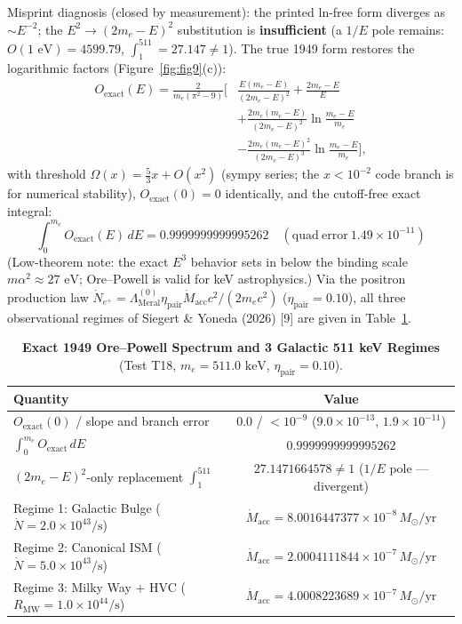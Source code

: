 \documentclass[12pt,a4paper]{article}
\begin{document}
Misprint diagnosis (closed by measurement): the printed ln-free form diverges as $\sim E^{-2}$; the $E^2\to(2m_e-E)^2$ substitution is \textbf{insufficient} (a $1/E$ pole remains: $O(1\text{ eV})=4599.79$, $\int_1^{511}=27.147\ne1$). The true 1949 form restores the logarithmic factors (Figure~\ref{fig:fig9}(c)):
\begin{equation}
\begin{split}
O_{\mathrm{exact}}(E) = \frac{2}{m_e(\pi^2-9)} \Bigg[ &\frac{E(m_e-E)}{(2m_e-E)^2} + \frac{2m_e-E}{E} \\
&+ \frac{2m_e(m_e-E)}{(2m_e-E)^2}\ln\frac{m_e-E}{m_e} \\
&- \frac{2m_e(m_e-E)^2}{(2m_e-E)^3}\ln\frac{m_e-E}{m_e} \Bigg],
\end{split}
\label{eq:oexact}
\end{equation}
with threshold $\Omega(x)=\frac53x+O(x^2)$ (sympy series; the $x<10^{-2}$ code branch is for numerical stability), $O_{\mathrm{exact}}(0)=0$ identically, and the cutoff-free exact integral:
\begin{equation}
\boxed{\int_0^{m_e} O_{\mathrm{exact}}(E)\,dE = 0.9999999999995262 \quad (\mathrm{quad\ error\ } 1.49\times 10^{-11})}
\label{eq:opnorm}
\end{equation}
(Low-theorem note: the exact $E^3$ behavior sets in below the binding scale $m\alpha^2\approx27\text{ eV}$; Ore--Powell is valid for keV astrophysics.) Via the positron production law $\dot{N}_{e^+} = \Lambda_{\mathrm{Meral}}^{(0)}\eta_{\mathrm{pair}}\dot{M}_{\mathrm{acc}}c^2/(2m_ec^2)$ ($\eta_{\mathrm{pair}}=0.10$), all three observational regimes of Siegert \& Yoneda (2026) [9] are given in Table~\ref{tab:t18}.

\begin{table}[!htbp]
\centering
\footnotesize
\setlength{\tabcolsep}{3pt}
\caption{\textbf{Exact 1949 Ore--Powell Spectrum and 3 Galactic 511 keV Regimes} (Test T18, $m_e=511.0\text{ keV}$, $\eta_{\mathrm{pair}}=0.10$).}
\label{tab:t18}
\vspace{0.1cm}
\begin{tabular}{@{}l|c@{}}
\hline
Quantity & Value \\
\hline
$O_{\mathrm{exact}}(0)$ / slope and branch error & $0.0$ / $<10^{-9}$ ($9.0\times10^{-13}$, $1.9\times10^{-11}$) \\
$\int_0^{m_e} O_{\mathrm{exact}}\,dE$ & $0.9999999999995262$ \\
$(2m_e-E)^2$-only replacement $\int_1^{511}$ & $27.1471664578\ne1$ ($1/E$ pole --- divergent) \\
Regime 1: Galactic Bulge ($\dot{N}=2.0\times10^{43}\text{/s}$) & $\dot{M}_{\mathrm{acc}} = 8.0016447377\times 10^{-8}\,M_\odot\text{/yr}$ \\
Regime 2: Canonical ISM ($\dot{N}=5.0\times10^{43}\text{/s}$) & $\dot{M}_{\mathrm{acc}} = 2.0004111844\times 10^{-7}\,M_\odot\text{/yr}$ \\
Regime 3: Milky Way + HVC ($R_{\mathrm{MW}}=1.0\times10^{44}\text{/s}$) & $\dot{M}_{\mathrm{acc}} = 4.0008223689\times 10^{-7}\,M_\odot\text{/yr}$ \\
\hline
\end{tabular}
\end{table}
\end{document}

